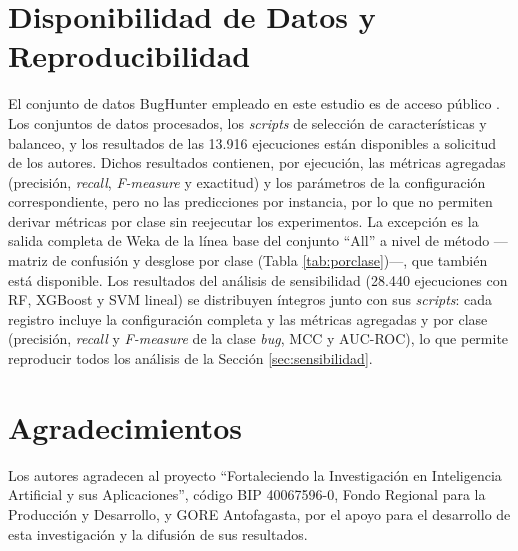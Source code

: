 \documentclass[conference,a4paper]{IEEEtran}
\begin{document}
\section*{Disponibilidad de Datos y Reproducibilidad}
El conjunto de datos BugHunter empleado en este estudio es de acceso público \cite{ferenc2020}. Los conjuntos de datos procesados, los \textit{scripts} de selección de características y balanceo, y los resultados de las 13.916 ejecuciones están disponibles a solicitud de los autores. Dichos resultados contienen, por ejecución, las métricas agregadas (precisión, \textit{recall}, \textit{F-measure} y exactitud) y los parámetros de la configuración correspondiente, pero no las predicciones por instancia, por lo que no permiten derivar métricas por clase sin reejecutar los experimentos. La excepción es la salida completa de Weka de la línea base del conjunto ``All'' a nivel de método ---matriz de confusión y desglose por clase (Tabla \ref{tab:porclase})---, que también está disponible. Los resultados del análisis de sensibilidad (28.440 ejecuciones con RF, XGBoost y SVM lineal) se distribuyen íntegros junto con sus \textit{scripts}: cada registro incluye la configuración completa y las métricas agregadas y por clase (precisión, \textit{recall} y \textit{F-measure} de la clase \textit{bug}, MCC y AUC-ROC), lo que permite reproducir todos los análisis de la Sección \ref{sec:sensibilidad}.

\section*{Agradecimientos}
Los autores agradecen al proyecto ``Fortaleciendo la Investigación en Inteligencia Artificial y sus Aplicaciones'', código BIP 40067596-0, Fondo Regional para la Producción y Desarrollo, y GORE Antofagasta, por el apoyo para el desarrollo de esta investigación y la difusión de sus resultados.
\end{document}
